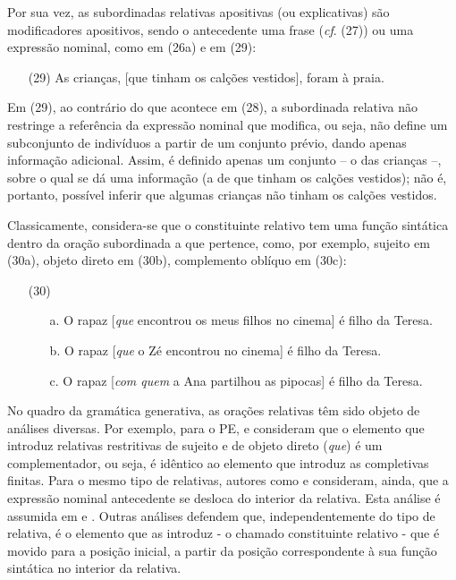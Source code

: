 \documentclass[output=paper,colorlinks,citecolor=brown,booklanguage=portuguese]{langscibook}
\begin{document}
Por sua vez, as subordinadas relativas apositivas (ou explicativas) são modificadores apositivos, sendo o antecedente uma frase (\emph{cf}. (27)) ou uma expressão nominal, como em (26a) e em (29): 

\begin{enumerate}[align=left]
    \item [(29)] As crianças, [que tinham os calções vestidos], foram à praia.
\end{enumerate}

Em (29), ao contrário do que acontece em (28), a subordinada relativa não restringe a referência da expressão nominal que modifica, ou seja, não define um subconjunto de indivíduos a partir de um conjunto prévio, dando apenas informação adicional. Assim, é definido apenas um conjunto – o das crianças –, sobre o qual se dá uma informação (a de que tinham os calções vestidos); não é, portanto, possível inferir que algumas crianças não tinham os calções vestidos.

Classicamente, considera-se que o constituinte relativo tem uma função sintática dentro da oração subordinada a que pertence, como, por exemplo, sujeito em (30a), objeto direto em (30b), complemento oblíquo em (30c):

\begin{enumerate}[align=left]
    \item [(30)]
    \begin{enumerate}
        \item [a.] O rapaz [\emph{que} encontrou os meus filhos no cinema] é filho da Teresa.
	\item[b.] O rapaz [\emph{que} o Zé encontrou no cinema] é filho da Teresa.
	\item[c.] O rapaz [\emph{com quem} a Ana partilhou as pipocas] é filho da Teresa.
    \end{enumerate}
\end{enumerate}

No quadro da gramática generativa, as orações relativas têm sido objeto de análises diversas. Por exemplo, para o PE, \citet{Brito1991} e \citet{Alexandre2000} consideram que o elemento que introduz relativas restritivas de sujeito e de objeto direto (\emph{que}) é um complementador, ou seja, é idêntico ao elemento que introduz as completivas finitas. Para o mesmo tipo de relativas, autores como \citet{Kayne1994} e \citet{Bianchi2000} consideram, ainda, que a expressão nominal antecedente se desloca do interior da relativa. Esta análise é assumida em  e . Outras análises defendem que, independentemente do tipo de relativa, é o elemento que as introduz - o chamado constituinte relativo - que é movido para a posição inicial, a partir da posição correspondente à sua função sintática no interior da relativa.
\end{document}
